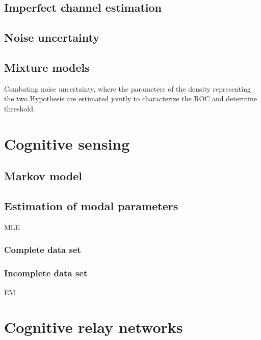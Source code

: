 \subsection{Imperfect channel estimation}
\subsection{Noise uncertainty}
\subsection{Mixture models}
Combating noise uncertainty, where the parameters of the density representing the two Hypothesis are estimated jointly to characterize the \ac{ROC} and determine threshold. 

\section{Cognitive sensing}
\subsection{Markov model}
\subsection{Estimation of modal parameters}
\ac{MLE}
\subsubsection{Complete data set}
\subsubsection{Incomplete data set}
\ac{EM}\cite{Kaushik_WCNC} 

\section{Cognitive relay networks}
